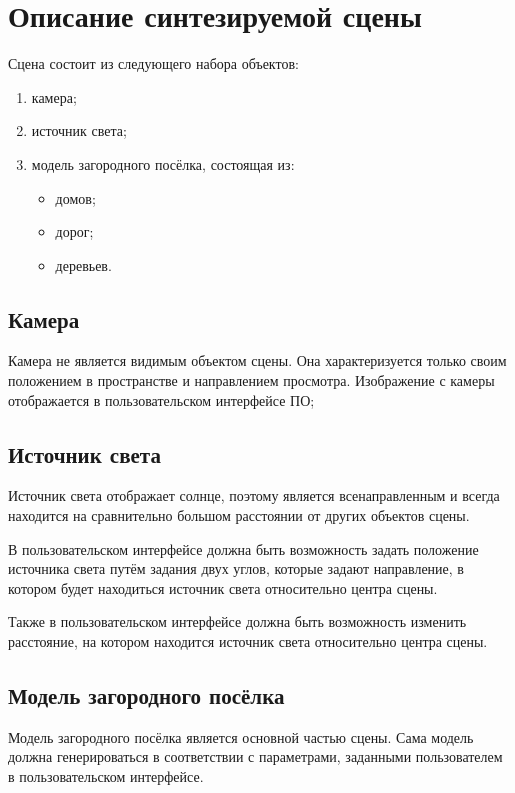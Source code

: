 
\section{Описание синтезируемой сцены}

Сцена состоит из следующего набора объектов:
\begin{enumerate}
    \item камера;
    \item источник света;
    \item модель загородного посёлка, состоящая из: 
    \begin{itemize}
        \item домов;
        \item дорог;
        \item деревьев.
    \end{itemize}
\end{enumerate}

\subsection*{Камера}

Камера не является видимым объектом сцены. Она характеризуется только своим положением в пространстве и направлением просмотра. Изображение с камеры отображается в пользовательском интерфейсе ПО;

\subsection*{Источник света}

Источник света отображает солнце, поэтому является всенаправленным и всегда находится на сравнительно большом расстоянии от других объектов сцены.

В пользовательском интерфейсе должна быть возможность задать положение источника света путём задания двух углов, которые задают направление, в котором будет находиться источник света относительно центра сцены. 

Также в пользовательском интерфейсе должна быть возможность изменить расстояние, на котором находится источник света относительно центра сцены.

\subsection*{Модель загородного посёлка}

Модель загородного посёлка является основной частью сцены. Сама модель должна генерироваться в соответствии с параметрами, заданными пользователем в пользовательском интерфейсе.

